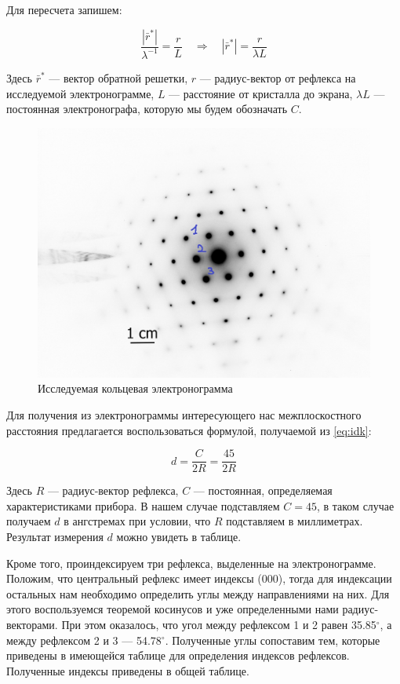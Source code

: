 \documentclass[a4paper, 12pt]{article}
\newcommand{\qrq}
{\ensuremath{\quad \Rightarrow \quad}} %
\begin{document}
Для пересчета запишем:

\begin{equation}
	\frac{|\bar{r}^*|}{\lambda^{-1}} = \frac{r}{L} \qrq |\bar{r}^*| = \frac{r}{\lambda L}
	\label{eq:idk}
\end{equation}

Здесь $\bar{r}^*$ --- вектор обратной решетки, $r$ --- радиус-вектор от рефлекса на исследуемой электронограмме, $L$ --- расстояние от кристалла до экрана, $\lambda L$ --- постоянная электронографа, которую мы будем обозначать $C$.


\begin{figure}[H]
	\centering
	\includegraphics[width=0.9\linewidth]{T2}
	\caption{Исследуемая кольцевая электронограмма}
	\label{fig:dots}
\end{figure}

Для получения из электронограммы интересующего нас межплоскостного расстояния предлагается воспользоваться формулой, получаемой из \ref{eq:idk}:

\begin{equation}
	d = \frac{C}{2 R} = \frac{45}{2 R}
\end{equation}

Здесь $R$ --- радиус-вектор рефлекса, $C$ --- постоянная, определяемая характеристиками прибора. В нашем случае подставляем $C = 45$, в таком случае получаем $d$ в ангстремах при условии, что $R$ подставляем в миллиметрах. Результат измерения $d$ можно увидеть в таблице.

Кроме того, проиндексируем три рефлекса, выделенные на электронограмме. Положим, что центральный рефлекс имеет индексы (000), тогда для индексации остальных нам необходимо определить углы между направлениями на них. Для этого воспользуемся теоремой косинусов и уже определенными нами радиус-векторами. При этом оказалось, что угол между рефлексом 1 и 2 равен 35.85$^\circ$, а между рефлексом 2 и 3 --- 54.78$^\circ$. Полученные углы сопоставим тем, которые приведены в имеющейся таблице для определения индексов рефлексов. Полученные индексы приведены в общей таблице.
\end{document}
